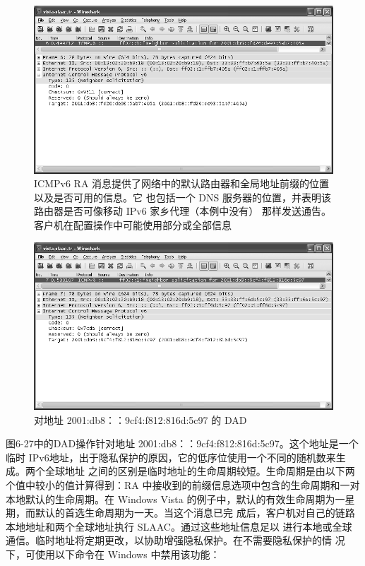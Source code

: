 \begin{figure}[H]
  \centering
  \includegraphics[scale=0.5]{imgs/6/6-26.png}
  \caption{ICMPv6 RA 消息提供了网络中的默认路由器和全局地址前缀的位置以及是否可用的信息。它
    也包括一个 DNS 服务器的位置，并表明该路由器是否可像移动 IPv6 家乡代理（本例中没有）
  那样发送通告。客户机在配置操作中可能使用部分或全部信息}
\end{figure}

\begin{figure}[H]
  \centering
  \includegraphics[scale=0.5]{imgs/6/6-27.png}
  \caption{对地址 2001:db8：：9cf4:f812:816d:5c97 的 DAD}
\end{figure}

图6-27中的DAD操作针对地址 2001:db8：：9cf4:f812:816d:5c97。这个地址是一个临时
IPv6地址，出于隐私保护的原因，它的低序位使用一个不同的随机数来生成。两个全球地址
之间的区别是临时地址的生命周期较短。生命周期是由以下两个值中较小的值计算得到：RA
中接收到的前缀信息选项中包含的生命周期和一对本地默认的生命周期。在 Windows Vista
的例子中，默认的有效生命周期为一星期，而默认的首选生命周期为一天。当这个消息已完
成后，客户机对自己的链路本地地址和两个全球地址执行 SLAAC。通过这些地址信息足以
进行本地或全球通信。临时地址将定期更改，以协助增强隐私保护。在不需要隐私保护的情
况下，可使用以下命令在 Windows 中禁用该功能：

